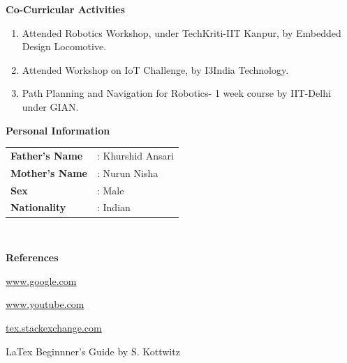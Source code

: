 \documentclass[a4paper,12pt,final]{memoir}
\newcommand{\Sep}{\vspace{1.5em}}
\newcommand{\SmallSep}{\vspace{0.5em}}
\newcommand{\CVSection}[1]
	{\Large\textbf{#1}\par
	\SmallSep\normalsize\normalfont}
\newcommand{\CVItem}[1]
	{\textbf{\color{RoyalBlue} #1}}
\begin{document}
\Sep
\CVSection{Co-Curricular Activities}
\begin{enumerate}[1.]
\item Attended Robotics Workshop, under TechKriti-IIT Kanpur, by Embedded Design Locomotive.
\item Attended Workshop on IoT Challenge, by I3India Technology.
\item Path Planning and Navigation for Robotics- 1 week course by IIT-Delhi under GIAN.
\end{enumerate}
\Sep
\CVSection{Personal Information}
\begin{tabular}{l l}
\CVItem{Father's Name} & : Khurshid Ansari\\
\CVItem{Mother's Name} & : Nurun Nisha \\
\CVItem{Sex} & : Male \\
\CVItem{Nationality} & : Indian\\

\end{tabular}\\
\Sep

\CVSection{References}
\begin{compactitem}[\color{RoyalBlue}$\circ$]
\item\url{www.google.com}
\item\url{www.youtube.com}
\item\url{tex.stackexchange.com}
\item\noindent LaTex Beginnner's Guide by S. Kottwitz	
\end{compactitem}
\Sep
\end{document}
